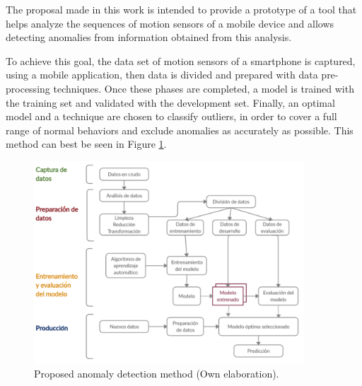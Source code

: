 \vspace{5mm} %

The proposal made in this work is intended to provide a prototype of a tool that helps analyze the sequences of motion sensors of a mobile device and allows detecting anomalies from information obtained from this analysis.

\vspace{5mm} %

To achieve this goal, the data set of motion sensors of a smartphone is captured, using a mobile application, then data is divided and prepared with data pre-processing techniques. Once these phases are completed, a model is trained with the training set and validated with the development set. Finally, an optimal model and a technique are chosen to classify outliers, in order to cover a full range of normal behaviors and exclude anomalies as accurately as possible. This method can best be seen in Figure \ref{fig:modeloAnomalias}.

\begin{figure}[h!]
  \begin{center}	\includegraphics[width=0.90\textwidth,frame]{imagenes/Cap2/metodo1}
  \caption{Proposed anomaly detection method (Own elaboration).}
  \label{fig:modeloAnomalias}
  \end{center}
\end{figure}

